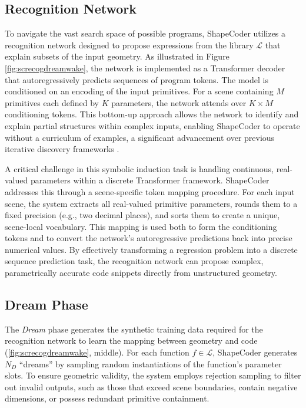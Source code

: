 \documentclass{thesis}
\begin{document}
\subsection{Recognition Network}
To navigate the vast search space of possible programs, ShapeCoder utilizes a recognition network designed to propose expressions from the library $\mathcal{L}$ that explain subsets of the input geometry. As illustrated in Figure \ref{fig:screcogdreamwake}, the network is implemented as a Transformer decoder \cite{Vaswani2017} that autoregressively predicts sequences of program tokens. The model is conditioned on an encoding of the input primitives. For a scene containing $M$ primitives each defined by $K$ parameters, the network attends over $K \times M$ conditioning tokens. This bottom-up approach allows the network to identify and explain partial structures within complex inputs, enabling ShapeCoder to operate without a curriculum of examples, a significant advancement over previous iterative discovery frameworks \cite{DreamCoder, ShapeMOD}.

A critical challenge in this symbolic induction task is handling continuous, real-valued parameters within a discrete Transformer framework. ShapeCoder addresses this through a scene-specific token mapping procedure. For each input scene, the system extracts all real-valued primitive parameters, rounds them to a fixed precision (e.g., two decimal places), and sorts them to create a unique, scene-local vocabulary. This mapping is used both to form the conditioning tokens and to convert the network's autoregressive predictions back into precise numerical values. By effectively transforming a regression problem into a discrete sequence prediction task, the recognition network can propose complex, parametrically accurate code snippets directly from unstructured geometry.

\subsection{Dream Phase}
The \textit{Dream} phase generates the synthetic training data required for the recognition network to learn the mapping between geometry and code (\autoref{fig:screcogdreamwake}, middle). For each function $f \in \mathcal{L}$, ShapeCoder generates $N_D$ ``dreams'' by sampling random instantiations of the function's parameter slots. To ensure geometric validity, the system employs rejection sampling to filter out invalid outputs, such as those that exceed scene boundaries, contain negative dimensions, or possess redundant primitive containment.
\end{document}
